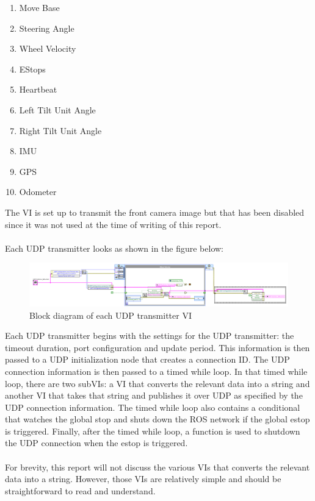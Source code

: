 \begin{enumerate}
\item Move Base
\item Steering Angle
\item Wheel Velocity
\item EStops
\item Heartbeat
\item Left Tilt Unit Angle
\item Right Tilt Unit Angle
\item IMU
\item GPS
\item Odometer
\end{enumerate}

\noindent The VI is set up to transmit the front camera image but that has been disabled since it was not used at the time of writing of this report.\\ \\
%
Each UDP transmitter looks as shown in the figure below:

\begin{figure}[h!]
\centering
\includegraphics[scale=0.75]{Photos/udppub.png}
\caption{Block diagram of each UDP transmitter VI}
\label{fig:udppub}
\end{figure}

\noindent Each UDP transmitter begins with the settings for the UDP transmitter: the timeout duration, port configuration and update period. This information is then passed to a UDP initialization node that creates a connection ID. The UDP connection information is then passed to a timed while loop. In that timed while loop, there are two subVIs: a VI that converts the relevant data into a string and another VI that takes that string and publishes it over UDP as specified by the UDP connection information. The timed while loop also contains a conditional that watches the global stop and shuts down the ROS network if the global estop is triggered. Finally, after the timed while loop, a function is used to shutdown the UDP connection when the estop is triggered.\\ \\
%
For brevity, this report will not discuss the various VIs that converts the relevant data into a string. However, those VIs are relatively simple and should be straightforward to read and understand.

